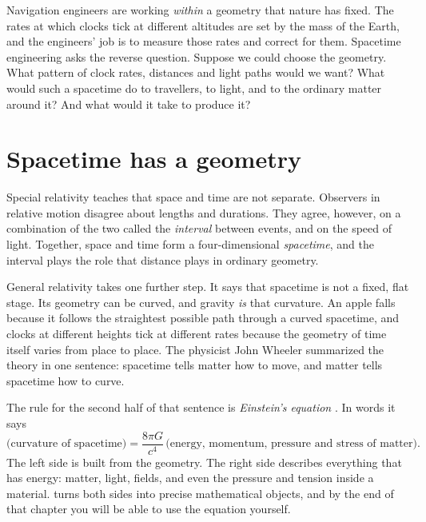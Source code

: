 Navigation engineers are working \emph{within} a geometry that nature has
fixed. The rates at which clocks tick at different altitudes are set by the
mass of the Earth, and the engineers' job is to measure those rates and correct
for them. Spacetime engineering asks the reverse question. Suppose we could
choose the geometry. What pattern of clock rates, distances and light paths
would we want? What would such a spacetime do to travellers, to light, and to
the ordinary matter around it? And what would it take to produce it?

\section{Spacetime has a geometry}\label{sec:spacetime-geometry}

Special relativity teaches that space and time are not separate. Observers in
relative motion disagree about lengths and durations. They agree, however, on a
combination of the two called the \emph{interval} between events, and on the
speed of light. Together, space and time form a four-dimensional
\emph{spacetime}, and the interval plays the role that distance plays in
ordinary geometry.

General relativity takes one further step. It says that spacetime is not a
fixed, flat stage. Its geometry can be curved, and gravity \emph{is} that
curvature. An apple falls because it follows the straightest possible path
through a curved spacetime, and clocks at different heights tick at different
rates because the geometry of time itself varies from place to place. The
physicist John Wheeler summarized the theory in one sentence: spacetime tells
matter how to move, and matter tells spacetime how to curve.

The rule for the second half of that sentence is \emph{Einstein's equation}
\parencite{Einstein1916}. In words it says
\begin{equation}
  \bigl(\text{curvature of spacetime}\bigr)
  = \frac{8\pi G}{c^{4}}\,
  \bigl(\text{energy, momentum, pressure and stress of matter}\bigr).
  \label{eq:einstein-words}
\end{equation}
The left side is built from the geometry. The right side describes everything
that has energy: matter, light, fields, and even the pressure and tension
inside a material.  turns both sides into precise
mathematical objects, and by the end of that chapter you will be able to use
the equation yourself.

